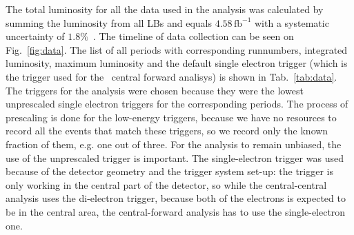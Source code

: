 The total luminosity for all the data used in the analysis was calculated by summing the luminosity from all LBs and equals \ensuremath{4.58\,\mathrm{fb}^{-1}} with a systematic uncertainty of $1.8\%$~\cite{lib:lumi}. The timeline of data collection can be seen on Fig.~\ref{fig:data}. The list of all periods with corresponding runnumbers, integrated luminosity, maximum luminosity and the default single electron trigger (which is the trigger used for the \Zee\ central forward analisys) is shown in Tab.~\ref{tab:data}. The triggers for the analysis were chosen because they were the lowest unprescaled single electron triggers for the corresponding periods. The process of prescaling is done for the low-energy triggers, because we have no resources to record all the events that match these triggers, so we record only the known fraction of them, e.g. one out of three. For the analysis to remain unbiased, the use of the unprescaled trigger is important. The single-electron trigger was used because of the detector geometry and the trigger system set-up: the trigger is only working in the central part of the detector, so while the central-central analysis uses the di-electron trigger, because both of the electrons is expected to be in the central area, the central-forward analysis has to use the single-electron one.

\begin{figure}
\end{figure}



